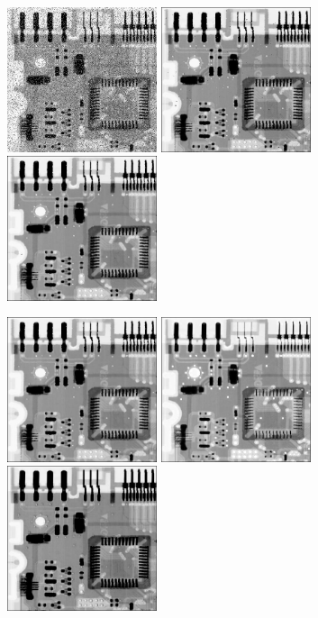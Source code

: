 \documentclass{article}
\begin{document}
\includegraphics[width=0.33\textwidth]{../data/pepper_salt_Circuit.jpg}
\includegraphics[width=0.33\textwidth]{../data/median_pepper_salt_Circuit.jpg}
\includegraphics[width=0.33\textwidth]{../data/median_median_pepper_salt_Circuit.jpg}

\includegraphics[width=0.33\textwidth]{../data/median_median_median_pepper_salt_Circuit.jpg}
\includegraphics[width=0.33\textwidth]{../data/max_pepper_Circuit.jpg}
\includegraphics[width=0.33\textwidth]{../data/min_salt_Circuit.jpg}
\end{document}

